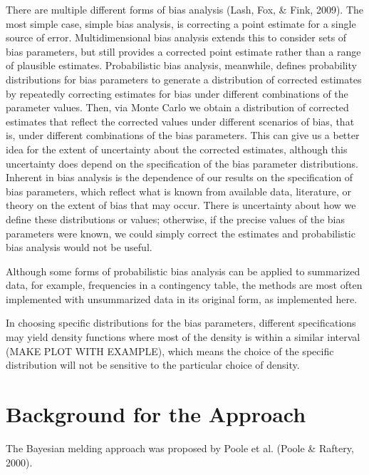 \documentclass[12pt,twoside]{smiththesis}
\begin{document}
There are multiple different forms of bias analysis (Lash, Fox, \& Fink, 2009). The most simple case, simple bias analysis, is correcting a point estimate for a single source of error. Multidimensional bias analysis extends this to consider sets of bias parameters, but still provides a corrected point estimate rather than a range of plausible estimates. Probabilistic bias analysis, meanwhile, defines probability distributions for bias parameters to generate a distribution of corrected estimates by repeatedly correcting estimates for bias under different combinations of the parameter values. Then, via Monte Carlo we obtain a distribution of corrected estimates that reflect the corrected values under different scenarios of bias, that is, under different combinations of the bias parameters. This can give us a better idea for the extent of uncertainty about the corrected estimates, although this uncertainty does depend on the specification of the bias parameter distributions. Inherent in bias analysis is the dependence of our results on the specification of bias parameters, which reflect what is known from available data, literature, or theory on the extent of bias that may occur. There is uncertainty about how we define these distributions or values; otherwise, if the precise values of the bias parameters were known, we could simply correct the estimates and probabilistic bias analysis would not be useful.

Although some forms of probabilistic bias analysis can be applied to summarized data, for example, frequencies in a contingency table, the methods are most often implemented with unsummarized data in its original form, as implemented here.

In choosing specific distributions for the bias parameters, different specifications may yield density functions where most of the density is within a similar interval (MAKE PLOT WITH EXAMPLE), which means the choice of the specific distribution will not be sensitive to the particular choice of density.

\hypertarget{background-for-the-approach}{%
\section{Background for the Approach}\label{background-for-the-approach}}

The Bayesian melding approach was proposed by Poole et al. (Poole \& Raftery, 2000).
\end{document}
